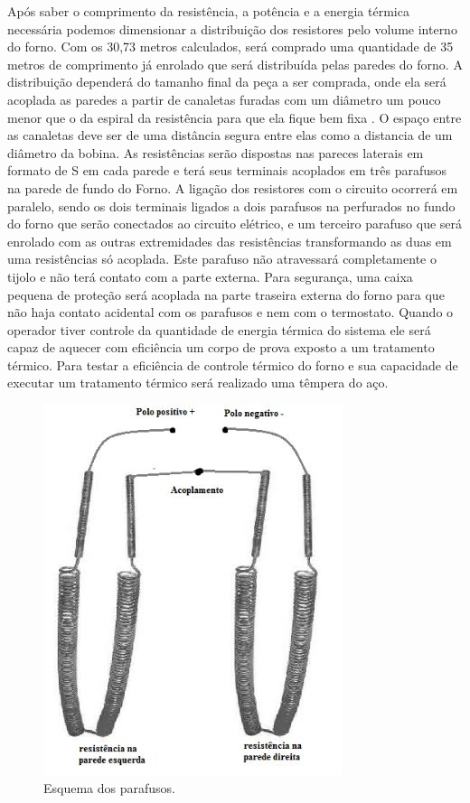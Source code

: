 Após saber o comprimento da resistência, a potência e a energia térmica necessária podemos dimensionar a distribuição dos resistores pelo volume interno do forno. Com os 30,73 metros calculados, será comprado uma quantidade de 35 metros de comprimento já enrolado que será distribuída pelas paredes do forno. 
A distribuição dependerá do tamanho final da peça a ser comprada, onde ela será acoplada as paredes a partir de canaletas furadas com um diâmetro um pouco menor que o da espiral da resistência para que ela fique bem fixa . O espaço entre as canaletas deve ser de uma distância segura entre elas como a distancia de um diâmetro da bobina. As resistências serão dispostas nas pareces laterais em formato de S em cada parede e terá seus terminais acoplados em três parafusos na parede de fundo do Forno. A ligação dos resistores com o circuito ocorrerá em paralelo, sendo os dois terminais ligados a dois parafusos na perfurados no fundo do forno que serão conectados ao circuito elétrico, e um terceiro parafuso que será enrolado com as outras extremidades das resistências transformando as duas em uma resistências só acoplada. Este parafuso não atravessará completamente o tijolo e não terá contato com a parte externa. Para segurança, uma caixa pequena de proteção será acoplada na parte traseira externa do forno para que não haja contato acidental com os parafusos e nem com o termostato.
Quando o operador tiver controle da quantidade de energia térmica do sistema ele será capaz de aquecer com eficiência um corpo de prova exposto a um tratamento térmico. Para testar a eficiência de controle térmico do forno e sua capacidade de executar um tratamento térmico será realizado uma têmpera do aço.
\begin{figure}[!h]
	\centering
	\label{parafusos}
	\includegraphics[keepaspectratio=true,scale=0.8]{figuras/parafusos.JPG}
	\caption{Esquema dos parafusos.}
\end{figure}

